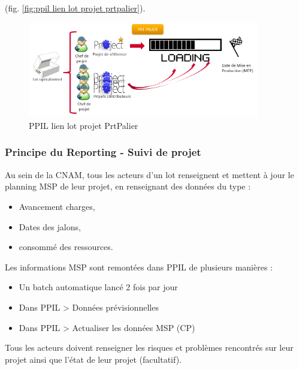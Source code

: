 (fig. \ref{fig:ppil lien lot projet prtpalier}).

\begin{figure}[!h]
\centering
\includegraphics[width=0.9\textwidth]{images/ppil lien lot projet prtpalier.png}
\caption{PPIL lien lot projet PrtPalier}
\end{figure}

\subsubsection{Principe du Reporting - Suivi de projet}

Au sein de la CNAM, tous les acteurs d’un lot renseignent et mettent à jour le planning MSP de leur projet, en renseignant des données du type :

\vspace{1\baselineskip}

\begin{itemize}
    \item Avancement charges, 
    \item Dates des jalons, 
    \item consommé des ressources.
\end{itemize}

\vspace{1\baselineskip}

Les informations MSP sont remontées dans PPIL de plusieurs manières :
\begin{itemize}
    \item Un batch automatique lancé 2 fois par jour
    \item Dans PPIL > Données prévisionnelles
    \item Dans PPIL > Actualiser les données MSP (CP)
\end{itemize}

\vspace{1\baselineskip}

Tous les acteurs doivent renseigner les risques et problèmes rencontrés sur leur projet ainsi que l'état de leur projet (facultatif).

